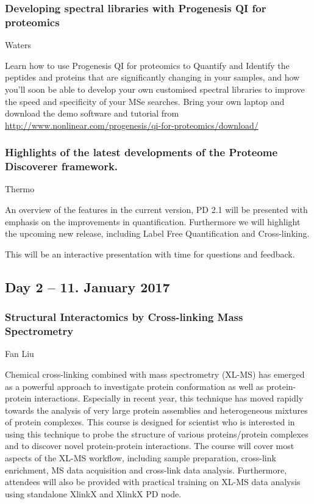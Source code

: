 \subsubsection*{\color{eubicRed} Developing spectral libraries with Progenesis QI for proteomics}
{\color{eubicGray} Waters}

Learn how to use Progenesis QI for proteomics to Quantify and Identify the
peptides and proteins that are significantly changing in your samples, and how
you'll soon be able to develop your own customised spectral libraries to improve
the speed and specificity of your MSe searches. Bring your own laptop and
download the demo software and tutorial from
\url{http://www.nonlinear.com/progenesis/qi-for-proteomics/download/}


\subsubsection*{\color{eubicRed} Highlights of the latest developments of the Proteome Discoverer framework.}
{\color{eubicGray} Thermo}

An overview of the features in the current version, PD 2.1 will be presented
with emphasis on the improvements in quantification. Furthermore we will
highlight the upcoming  new release, including Label Free Quantification and
Cross-linking.

This will be an interactive presentation with time for questions and feedback.


\subsection*{Day 2 -- 11. January 2017}

\subsubsection*{\color{eubicRed} Structural Interactomics by Cross-linking Mass Spectrometry}
{\color{eubicGray} Fan Liu}

Chemical cross-linking combined with mass spectrometry (XL-MS) has emerged as a
powerful approach to investigate protein conformation as well as protein-protein
interactions. Especially in recent year, this technique has moved rapidly
towards the analysis of very large protein assemblies and heterogeneous mixtures
of protein complexes. This course is designed for scientist who is interested in
using this technique to probe the structure of various proteins/protein
complexes and to discover novel protein-protein interactions. The course will
cover most aspects of the XL-MS workflow, including sample preparation,
cross-link enrichment, MS data acquisition and cross-link data analysis.
Furthermore, attendees will also be provided with practical training on XL-MS
data analysis using standalone XlinkX and XlinkX PD node.


